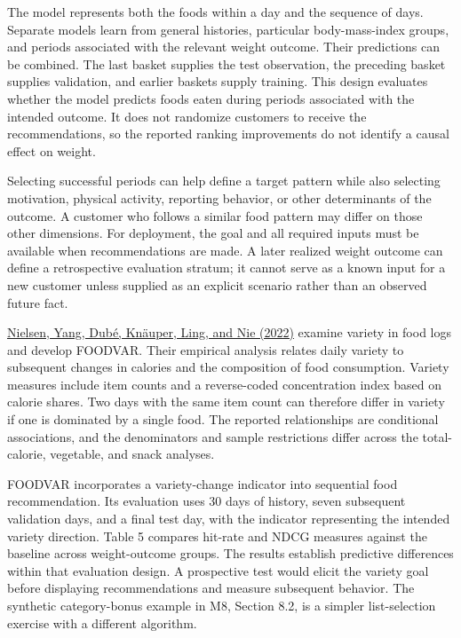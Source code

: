 The model represents both the foods within a day and the sequence of
days. Separate models learn from general histories, particular
body-mass-index groups, and periods associated with the relevant weight
outcome. Their predictions can be combined. The last basket supplies the
test observation, the preceding basket supplies validation, and earlier
baskets supply training. This design evaluates whether the model
predicts foods eaten during periods associated with the intended
outcome. It does not randomize customers to receive the recommendations,
so the reported ranking improvements do not identify a causal effect on
weight.

Selecting successful periods can help define a target pattern while also
selecting motivation, physical activity, reporting behavior, or other
determinants of the outcome. A customer who follows a similar food
pattern may differ on those other dimensions. For deployment, the goal
and all required inputs must be available when recommendations are made.
A later realized weight outcome can define a retrospective evaluation
stratum; it cannot serve as a known input for a new customer unless
supplied as an explicit scenario rather than an observed future fact.

\href{https://doi.org/10.1086/720453}{Nielsen, Yang, Dubé, Knäuper,
Ling, and Nie (2022)} examine variety in food logs and develop FOODVAR.
Their empirical analysis relates daily variety to subsequent changes in
calories and the composition of food consumption. Variety measures
include item counts and a reverse-coded concentration index based on
calorie shares. Two days with the same item count can therefore differ
in variety if one is dominated by a single food. The reported
relationships are conditional associations, and the denominators and
sample restrictions differ across the total-calorie, vegetable, and
snack analyses.

FOODVAR incorporates a variety-change indicator into sequential food
recommendation. Its evaluation uses 30 days of history, seven subsequent
validation days, and a final test day, with the indicator representing
the intended variety direction. Table 5 compares hit-rate and NDCG
measures against the baseline across weight-outcome groups. The results
establish predictive differences within that evaluation design. A
prospective test would elicit the variety goal before displaying
recommendations and measure subsequent behavior. The synthetic
category-bonus example in M8, Section 8.2, is a simpler list-selection
exercise with a different algorithm.

